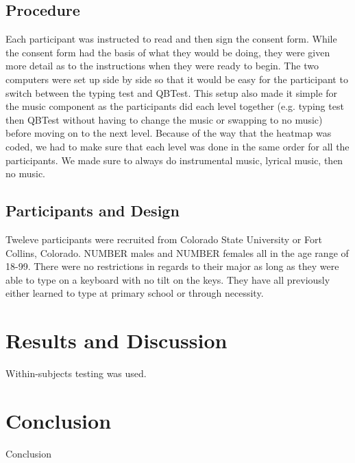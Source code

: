 \documentclass[manuscript, screen, review]{acmart} %
\begin{document}
\subsection[short]{Procedure}
Each participant was instructed to read and then sign the consent form. While the consent form had the basis of what they would be doing, they were given more detail as to the instructions when they were ready to begin.
The two computers were set up side by side so that it would be easy for the participant to switch between the typing test and QBTest.
This setup also made it simple for the music component as the participants did each level together 
(e.g. typing test then QBTest without having to change the music or swapping to no music)
before moving on to the next level. 
Because of the way that the heatmap was coded, we had to make sure that each level was done in the same order for all the participants.
We made sure to always do instrumental music, lyrical music, then no music. 

\subsection[short]{Participants and Design}
Tweleve participants were recruited from Colorado State University or Fort Collins, Colorado. NUMBER males and NUMBER females all in the age range of 18-99. There were no %
restrictions in regards to their major as long as they were able to type on a keyboard with no tilt on the keys.
They have all previously either learned to type at primary school or through necessity.



\section{Results and Discussion}
Within-subjects testing was used.

\section{Conclusion}
Conclusion



\end{document}
